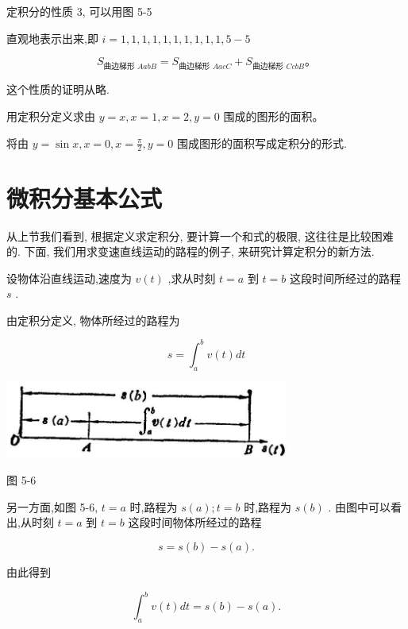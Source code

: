 \documentclass[lang=cn,newtx,10pt,scheme=chinese]{elegantbook}
\begin{document}
定积分的性质 3, 可以用图 5-5

直观地表示出来,即 \(i = 1,1,1,1,1,1,1,1,1,1,5 - 5\)

\[
{S}_{\text{曲边梯形 }{AabB}} = {S}_{\text{曲边梯形 }{AacC}} + {S}_{\text{曲边梯形 }{CcbB}}\text{。}
\]

这个性质的证明从略.

\begin{problemset}[练习]

\item 用定积分定义求由 \(y = x,x = 1,x = 2,y = 0\) 围成的图形的面积。

\item 将由 \(y = \sin x,x = 0,x = \frac{\pi }{2},y = 0\) 围成图形的面积写成定积分的形式.

\end{problemset}

\section{微积分基本公式}

从上节我们看到, 根据定义求定积分, 要计算一个和式的极限, 这往往是比较困难的. 下面, 我们用求变速直线运动的路程的例子, 来研究计算定积分的新方法.

设物体沿直线运动,速度为 \(v\left( t\right)\) ,求从时刻 \(t = a\) 到 \(t = b\) 这段时间所经过的路程 \(s\) .

由定积分定义, 物体所经过的路程为

\[
s = {\int }_{a}^{b}v\left( t\right) {dt}
\]

\begin{center}
\includegraphics[max width=0.7\textwidth]{images/01912c18-5c3f-733d-b775-749ba9897a9d_225_134815.jpg}
\end{center}

图 5-6

另一方面,如图 5-6, \(t = a\) 时,路程为 \(s\left( a\right) ;t = b\) 时,路程为 \(s\left( b\right)\) . 由图中可以看出,从时刻 \(t = a\) 到 \(t = b\) 这段时间物体所经过的路程

\[
s = s\left( b\right) - s\left( a\right) .
\]

由此得到

\[
{\int }_{a}^{b}v\left( t\right) {dt} = s\left( b\right) - s\left( a\right) .
\]
\end{document}
